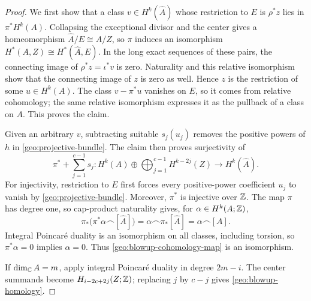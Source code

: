 \begin{proof}
We first show that a class $v\in H^k(\widehat A)$ whose restriction
to $E$ is $\rho^*z$ lies in $\pi^*H^k(A)$. Collapsing the exceptional
divisor and the center gives a homeomorphism
$\widehat A/E\cong A/Z$, so $\pi$ induces an isomorphism
$H^*(A,Z)\cong H^*(\widehat A,E)$. In the long exact sequences of
these pairs, the connecting image of $\rho^*z=\iota^*v$ is zero.
Naturality and this relative isomorphism show that the connecting
image of $z$ is zero as well. Hence $z$ is the restriction of some
$u\in H^k(A)$. The class $v-\pi^*u$ vanishes on $E$, so it comes
from relative cohomology; the same relative isomorphism expresses
it as the pullback of a class on $A$. This proves the claim.

Given an arbitrary $v$, subtracting suitable $s_j(u_j)$ removes the
positive powers of $h$ in \eqref{geo:projective-bundle}. The claim
then proves surjectivity of
\begin{equation}
\label{geo:blowup-cohomology-map}
 \pi^*+\sum_{j=1}^{c-1}s_j:
 H^k(A)\oplus\bigoplus_{j=1}^{c-1}H^{k-2j}(Z)
 \longrightarrow H^k(\widehat A).
\end{equation}
For injectivity, restriction to $E$ first forces every positive-power
coefficient $u_j$ to vanish by \eqref{geo:projective-bundle}.
Moreover, $\pi^*$ is injective over $\mathbb Z$. The map $\pi$ has degree
one, so cap-product naturality gives, for $\alpha\in H^k(A;\mathbb Z)$,
\[
 \pi_*\bigl(\pi^*\alpha\frown[\widehat A]\bigr)
 =\alpha\frown\pi_*[\widehat A]=\alpha\frown[A].
\]
Integral Poincar\'e duality is an isomorphism on all classes, including
torsion, so $\pi^*\alpha=0$ implies $\alpha=0$. Thus
\eqref{geo:blowup-cohomology-map} is an isomorphism.

If $\dim_{\mathbb C}A=m$, apply integral Poincar\'e duality in degree
$2m-i$. The center summands become $H_{i-2c+2j}(Z;\mathbb Z)$; replacing
$j$ by $c-j$ gives \eqref{geo:blowup-homology}.
\end{proof}

